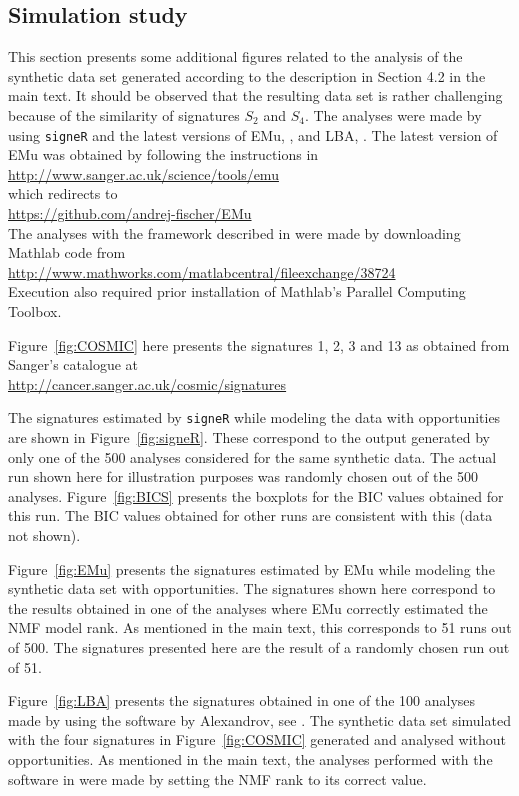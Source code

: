 \documentclass[11pt]{amsart}
\theoremstyle{definition}
\begin{document}
\subsection{Simulation study}
This section presents some additional figures related to the analysis
of the synthetic data set generated according to the description in
Section 4.2 in the main text. It should be observed that the resulting
data set is rather challenging because of the similarity of signatures
$S_2$ and $S_4$. The analyses were made by using \texttt{signeR} and
the latest versions of EMu, \cite{FICMV}, and LBA, \cite{A}. The
latest version of EMu was obtained by following the instructions in\\
\indent\url{http://www.sanger.ac.uk/science/tools/emu}\\  
which redirects to\\ 
\indent \url{https://github.com/andrej-fischer/EMu}\\
The analyses with the framework described in \cite{A} were made by
downloading Mathlab code from\\
\indent\url{http://www.mathworks.com/matlabcentral/fileexchange/38724}\\
Execution also required prior installation of Mathlab's Parallel
Computing Toolbox.

Figure~\ref{fig:COSMIC} here presents the signatures 1, 2, 3 and 13 as
obtained from Sanger's catalogue at\\
\indent\url{http://cancer.sanger.ac.uk/cosmic/signatures}

The signatures estimated by \texttt{signeR} while modeling the data
with opportunities are shown in Figure~\ref{fig:signeR}. These
correspond to the output generated by only one of the 500 analyses
considered for the same synthetic data. The actual run shown here for
illustration purposes was randomly chosen out of the 500 analyses.
Figure~\ref{fig:BICS} presents the boxplots for the BIC values
obtained for this run. The BIC values obtained for other runs are
consistent with this (data not shown).

Figure~\ref{fig:EMu} presents the signatures estimated by EMu  while
modeling the synthetic data set with opportunities. The signatures
shown here correspond to the results obtained in one of the analyses
where EMu correctly estimated the NMF model rank. As mentioned in the
main text, this corresponds to 51 runs out of 500. The signatures
presented here are the result of a randomly chosen run out of 51.

Figure~\ref{fig:LBA} presents the signatures obtained in one of the 
100 analyses made by using the software by Alexandrov, see
\cite{A}. The synthetic data set simulated with the four signatures
in Figure~\ref{fig:COSMIC} generated and analysed without
opportunities. As mentioned in the main text, the analyses performed
with the software in \cite{A} were made by setting the NMF rank to its
correct value.
\end{document}

